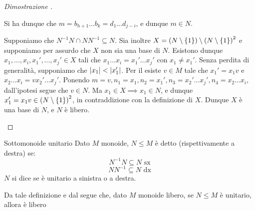 \begin{proof}[\extrasymbol{} Dimostrazione ]
\begin{description}
\begin{figure}[H]
      \end{figure}
    
      Si ha dunque che \(m = b_{h+1}\ldots b_k = d_1 \ldots d_{j-i}\), e dunque \(m \in N\).
    \item[\q{\(\impliedby\)}]
      Supponiamo che \(N^{-1}N \cap NN^{-1} \subseteq N\).
      Sia inoltre \(X = (N\setminus \set{1})\setminus{(N\setminus \set{1})}^2\) e supponiamo per assurdo che \(X\) non sia una base di \(N\).
      Esistono dunque \(x_1, \ldots, x_i, x_1', \ldots, x_j' \in X\) tali che \(x_1\ldots x_i = x_1'\ldots x_j'\) con \(x_1 \neq x_1'\).
      Senza perdita di generalità, supponiamo che \(\left|x_1\right| < \left|x_1'\right|\).
      Per il  esiste \(v \in M\) tale che \(x_1' = x_1 v\) e \(x_2 \ldots x_i = v x_2' \ldots x_j'\).
      Ponendo \(m = v, n_1 = x_1, n_2 = x_1', n_3 = x_2'\ldots x_j', n_4 =  x_2 \ldots x_i\), dall'ipotesi segue che \(v \in N\).
      Ma \(x_1 \in X \implies x_1 \in N\), e dunque \(x_1' = x_1 v \in {(N\setminus\set{1})}^2\), in contraddizione con la definizione di \(X\).
      Dunque \(X\) è una base di \(N\), e \(N\) è libero.
  \end{description}
      
\end{proof}



\begin{definition}{Sottomonoide unitario}
  Dato \(M\) monoide, \(N \leq M\) è detto  (rispettivamente a destra) se:
  \[N^{-1}N \subseteq N \text{ sx}\]
  \[NN^{-1} \subseteq N \text{ dx}\]
  \(N\) si dice  se è unitario a sinistra o a destra.
\end{definition}

Da tale definizione e dal  segue che, dato \(M\) monoide libero, se  \(N \leq M\) è unitario, allora è libero

